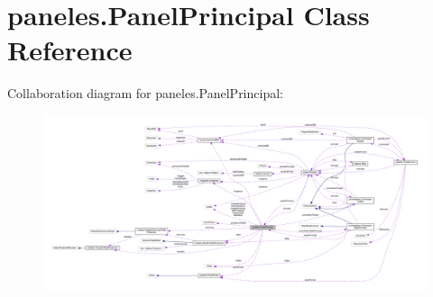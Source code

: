 \hypertarget{classpaneles_1_1_panel_principal}{}\section{paneles.\+Panel\+Principal Class Reference}
\label{classpaneles_1_1_panel_principal}


Collaboration diagram for paneles.\+Panel\+Principal\+:\nopagebreak
\begin{figure}[H]
\begin{center}
\leavevmode
\includegraphics[width=350pt]{classpaneles_1_1_panel_principal__coll__graph}
\end{center}
\end{figure}
